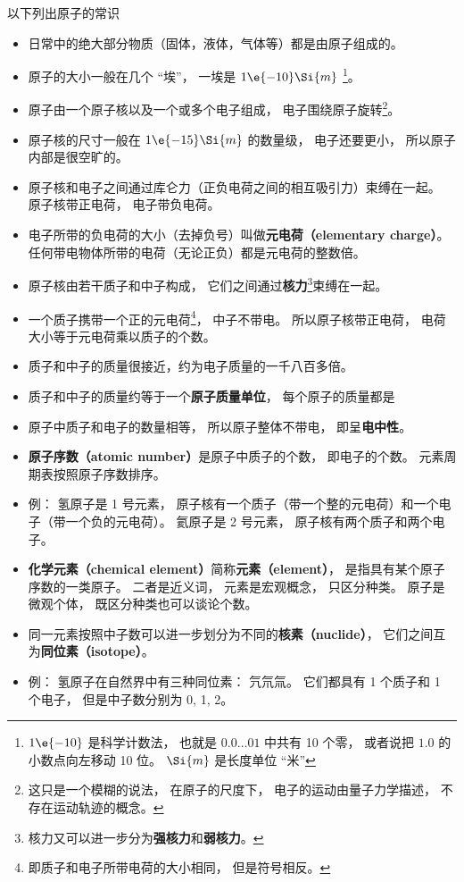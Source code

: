 
\begin{issues}
\issueDraft
\end{issues}


以下列出原子的常识
\begin{itemize}
\item 日常中的绝大部分物质（固体，液体，气体等）都是由原子组成的。
\item 原子的大小一般在几个 “埃”， 一埃是 $1\e{-10}\Si{m}$ \footnote{$1\e{-10}$ 是科学计数法， 也就是 $0.0\dots01$ 中共有 10 个零， 或者说把 $1.0$ 的小数点向左移动 10 位。 $\Si{m}$ 是长度单位 “米”}。 %
\item 原子由一个原子核以及一个或多个电子组成， 电子围绕原子旋转\footnote{这只是一个模糊的说法， 在原子的尺度下， 电子的运动由量子力学描述， 不存在运动轨迹的概念。}。
\item 原子核的尺寸一般在 $1\e{-15}\Si{m}$ 的数量级， 电子还要更小， 所以原子内部是很空旷的。
\item 原子核和电子之间通过库仑力（正负电荷之间的相互吸引力）束缚在一起。 原子核带正电荷， 电子带负电荷。 %
\item 电子所带的负电荷的大小（去掉负号）叫做\textbf{元电荷（elementary charge）}。 任何带电物体所带的电荷（无论正负）都是元电荷的整数倍。
\item 原子核由若干质子和中子构成， 它们之间通过\textbf{核力}\footnote{核力又可以进一步分为\textbf{强核力}和\textbf{弱核力}。}束缚在一起。
\item 一个质子携带一个正的元电荷\footnote{即质子和电子所带电荷的大小相同， 但是符号相反。}， 中子不带电。 所以原子核带正电荷， 电荷大小等于元电荷乘以质子的个数。
\item 质子和中子的质量很接近，约为电子质量的一千八百多倍。
\item 质子和中子的质量约等于一个\textbf{原子质量单位}， 每个原子的质量都是
\item 原子中质子和电子的数量相等， 所以原子整体不带电， 即呈\textbf{电中性}。
\item \textbf{原子序数（atomic number）}是原子中质子的个数， 即电子的个数。 元素周期表按照原子序数排序。
\item 例： 氢原子是 1 号元素， 原子核有一个质子（带一个整的元电荷）和一个电子（带一个负的元电荷）。 氦原子是 2 号元素， 原子核有两个质子和两个电子。
\item \textbf{化学元素（chemical element）}简称\textbf{元素（element）}， 是指具有某个原子序数的一类原子。 二者是近义词， 元素是宏观概念， 只区分种类。 原子是微观个体， 既区分种类也可以谈论个数。
\item 同一元素按照中子数可以进一步划分为不同的\textbf{核素（nuclide）}， 它们之间互为\textbf{同位素（isotope）}。
\item 例： 氢原子在自然界中有三种同位素： 氕氘氚。 它们都具有 1 个质子和 1 个电子， 但是中子数分别为 0, 1, 2。
\end{itemize}
